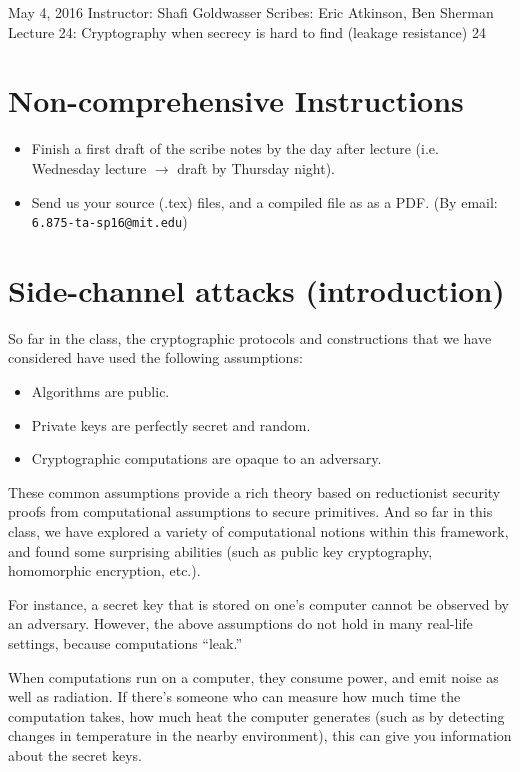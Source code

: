 \documentclass[10pt]{article}
\newcommand{\scribes}{Eric Atkinson, Ben Sherman}
\newcommand{\lecnumber}{24}
\newcommand{\lectitle}{Cryptography when secrecy is hard to find (leakage resistance)}
\newcommand{\thedate}{May 4, 2016}
\begin{document}


{\thedate}
{Instructor: Shafi Goldwasser}
{Scribes: \scribes}
{Lecture \lecnumber: \lectitle}
{\lecnumber}

\section{Non-comprehensive Instructions}
\begin{itemize}
	\item Finish a first draft of the scribe notes by the day after lecture (i.e. Wednesday lecture $\rightarrow$ draft by Thursday night).
	\item Send us your source (.tex) files, and a compiled file as as a PDF. (By email: {\tt 6.875-ta-sp16@mit.edu})
\end{itemize}

\section{Side-channel attacks (introduction)}

So far in the class, the cryptographic protocols and constructions that we have considered have used the following assumptions:
\begin{itemize}
\item Algorithms are public.
\item Private keys are perfectly secret and random.
\item Cryptographic computations are opaque to an adversary.
\end{itemize}

These common assumptions provide a rich theory based on reductionist security proofs from computational assumptions to secure primitives. And so far in this class, we have explored a variety of computational notions within this framework, and found some surprising abilities (such as public key cryptography, homomorphic encryption, etc.).

For instance, a secret key that is stored on one's computer cannot be observed by an adversary. However, the above assumptions do not hold in many real-life settings, because computations ``leak.''

When computations run on a computer, they consume power, and emit noise as well as radiation. If there's someone who can measure how much time the computation takes, how much heat the computer generates (such as by detecting changes in temperature in the nearby environment), this can give you information about the secret keys. 
\end{document}
